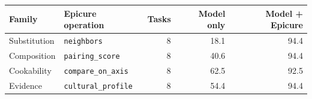 \begin{tabular}{@{}l l r r r@{}}
\toprule
Family & Epicure operation & Tasks & Model only & Model + Epicure \\
\midrule
Substitution & \texttt{neighbors} & 8 & 18.1 & 94.4 \\
Composition & \texttt{pairing\_score} & 8 & 40.6 & 94.4 \\
Cookability & \texttt{compare\_on\_axis} & 8 & 62.5 & 92.5 \\
Evidence & \texttt{cultural\_profile} & 8 & 54.4 & 94.4 \\
\bottomrule
\end{tabular}
